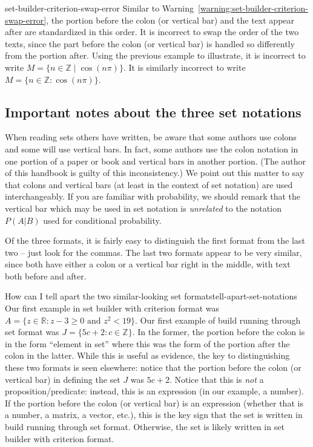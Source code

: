 \documentclass{book}
\theoremstyle{ekimcustom}
\begin{document}
\begin{bwarning}{}{set-builder-criterion-swap-error}
Similar to Warning~\ref{warning:set-builder-criterion-swap-error}, the portion before the colon (or vertical bar) and the text appear after are standardized in this order. It is incorrect to swap the order of the two texts, since the part before the colon (or vertical bar) is handled so differently from the portion after.
\vskip6pt
Using the previous example to illustrate, it is incorrect to write $M = \{ n \in \mathbb{Z} \mid \cos(n\pi) \}$. It is similarly incorrect to write $M = \{ n \in \mathbb{Z} : \cos(n\pi) \}$.
\end{bwarning}

\subsection{Important notes about the three set notations}

When reading sets others have written, be aware that some authors use colons and some will use vertical bars. In fact, some authors use the colon notation in one portion of a paper or book and vertical bars in another portion. (The author of this handbook is guilty of this inconsistency.) We point out this matter to say that colons and vertical bars (at least in the context of set notation) are used interchangeably. If you are familiar with probability, we should remark that the vertical bar which may be used in set notation is \emph{unrelated} to the notation $P(A|B)$ used for conditional probability.

Of the three formats, it is fairly easy to distinguish the first format from the last two -- just look for the commas. The last two formats appear to be very similar, since both have either a colon or a vertical bar right in the middle, with text both before and after.
\begin{bmethod}{How can I tell apart the two similar-looking set formats}{tell-apart-set-notations}
Our first example in set builder with criterion format was $A = \{z \in \mathbb{R} : z-3 \geq 0 \text{ and } z^2 < 19\}$. Our first example of build running through set format was $J = \{ 5c + 2 : c \in \mathbb{Z}\}$.
\vskip6pt
In the former, the portion before the colon is in the form ``element in set'' where this was the form of the portion after the colon in the latter.
\vskip6pt
While this is useful as evidence, the key to distinguishing these two formats is seen elsewhere: notice that the portion before the colon (or vertical bar) in defining the set $J$ was $5c+2$. Notice that this is \emph{not} a proposition/predicate: instead, this is an expression (in our example, a number). If the portion before the colon (or vertical bar) is an expression (whether that is a number, a matrix, a vector, etc.), this is the key sign that the set is written in build running through set format. Otherwise, the set is likely written in set builder with criterion format.
\end{bmethod}
\end{document}
